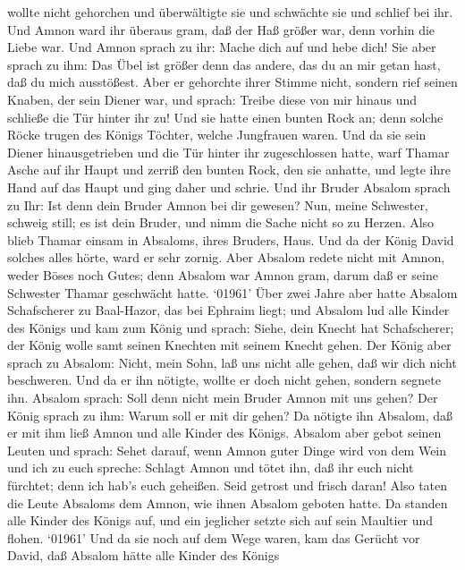 wollte nicht gehorchen und überwältigte sie und schwächte sie und
schlief bei ihr.  Und Amnon ward ihr überaus gram, daß der
Haß größer war, denn vorhin die Liebe war. Und Amnon sprach zu ihr:
Mache dich auf und hebe dich!  Sie aber sprach zu ihm: Das
Übel ist größer denn das andere, das du an mir getan hast, daß du mich
ausstößest. Aber er gehorchte ihrer Stimme nicht,  sondern
rief seinen Knaben, der sein Diener war, und sprach: Treibe diese von
mir hinaus und schließe die Tür hinter ihr zu!  Und sie
hatte einen bunten Rock an; denn solche Röcke trugen des Königs Töchter,
welche Jungfrauen waren. Und da sie sein Diener hinausgetrieben und die
Tür hinter ihr zugeschlossen hatte,  warf Thamar Asche auf
ihr Haupt und zerriß den bunten Rock, den sie anhatte, und legte ihre
Hand auf das Haupt und ging daher und schrie.  Und ihr
Bruder Absalom sprach zu Ihr: Ist denn dein Bruder Amnon bei dir
gewesen? Nun, meine Schwester, schweig still; es ist dein Bruder, und
nimm die Sache nicht so zu Herzen. Also blieb Thamar einsam in Absaloms,
ihres Bruders, Haus.  Und da der König David solches alles
hörte, ward er sehr zornig. Aber Absalom redete nicht mit Amnon, weder
Böses noch Gutes;  denn Absalom war Amnon gram, darum daß
er seine Schwester Thamar geschwächt hatte.  `01961' Über
zwei Jahre aber hatte Absalom Schafscherer zu Baal-Hazor, das bei
Ephraim liegt; und Absalom lud alle Kinder des Königs  und
kam zum König und sprach: Siehe, dein Knecht hat Schafscherer; der König
wolle samt seinen Knechten mit seinem Knecht gehen.  Der
König aber sprach zu Absalom: Nicht, mein Sohn, laß uns nicht alle
gehen, daß wir dich nicht beschweren. Und da er ihn nötigte, wollte er
doch nicht gehen, sondern segnete ihn.  Absalom sprach:
Soll denn nicht mein Bruder Amnon mit uns gehen? Der König sprach zu
ihm: Warum soll er mit dir gehen?  Da nötigte ihn Absalom,
daß er mit ihm ließ Amnon und alle Kinder des Königs. 
Absalom aber gebot seinen Leuten und sprach: Sehet darauf, wenn Amnon
guter Dinge wird von dem Wein und ich zu euch spreche: Schlagt Amnon und
tötet ihn, daß ihr euch nicht fürchtet; denn ich hab's euch geheißen.
Seid getrost und frisch daran!  Also taten die Leute
Absaloms dem Amnon, wie ihnen Absalom geboten hatte. Da standen alle
Kinder des Königs auf, und ein jeglicher setzte sich auf sein Maultier
und flohen.  `01961' Und da sie noch auf dem Wege waren,
kam das Gerücht vor David, daß Absalom hätte alle Kinder des Königs
